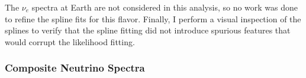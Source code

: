 The $\nu_e$ spectra at Earth are not considered in this analysis, so no work was done to refine the spline fits for this flavor.
Finally, I perform a visual inspection of the splines to verify that the spline fitting did not introduce spurious features that would corrupt the likelihood fitting.

\subsubsection{Composite Neutrino Spectra}\label{sec:icDM_composite_dNdE}

\begin{figure}[!hb]
\end{figure}
